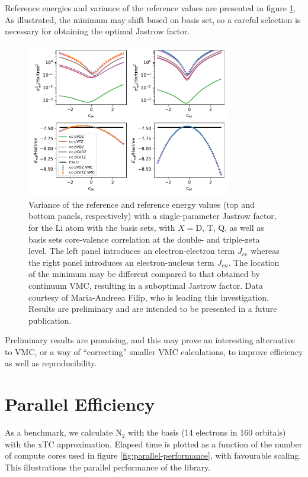 Reference energies and variance of the reference values are presented in figure \ref{fig:det-opt}. As illustrated, the minimum may shift based on basis set, so a careful selection is necessary for obtaining the optimal Jastrow factor.

\begin{figure}[htbp]
    \centering
    \includegraphics[width=0.8\textwidth]{figures/pytchint/andreea/1parameter}
    \caption{Variance of the reference and reference energy values (top and bottom panels, respectively) with a single-parameter Jastrow factor, for the Li atom with the  basis sets, with $X=$D, T, Q, as well as basis sets core-valence correlation at the double- and triple-zeta level. The left panel introduces an electron-electron term $J_{ee}$ whereas the right panel introduces an electron-nucleus term $J_{en}$. The location of the minimum may be different compared to that obtained by continuum VMC, resulting in a suboptimal Jastrow factor. Data courtesy of Maria-Andreea Filip, who is leading this investigation. Results are preliminary and are intended to be presented in a future publication.}
    \label{fig:det-opt}
\end{figure}

Preliminary results are promising, and this may prove an interesting alternative to \gls{VMC}, or a way of ``correcting'' smaller VMC calculations, to improve efficiency as well as reproducibility.

\section{Parallel Efficiency}

As a benchmark, we calculate N$_2$ with the \avqz basis (14 electrons in 160 orbitals) with the \gls{xTC} approximation. Elapsed time is plotted as a function of the number of compute cores used in figure \ref{fig:parallel-performance}, with favourable scaling. This illustrations the parallel performance of the \pytchint library.

